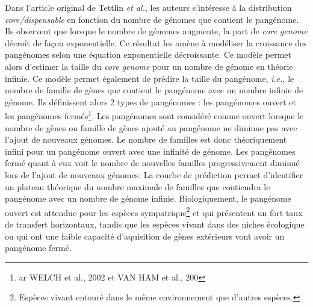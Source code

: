 Dans l'article original de Tettlin \textit{et al.}, les auteurs s'intéresse à la distribution \textit{core/dispensable} en fonction du nombre de génomes que contient le pangénome. Ils observent que lorsque le nombre de génomes augmente, la part de \textit{core genome} décroît de façon exponentielle. Ce résultat les amène à modéliser la croissance des pangénomes selon une équation exponentielle décroissante. Ce modèle permet alors d'estimer la taille du \textit{core genome} pour un nombre de génome en théorie infinie. Ce modèle permet également de prédire la taille du pangénome, \textit{i.e.}, le nombre de famille de gènes que contient le pangénome avec un nombre infinie de génome. Ils définissent alors 2 types de pangénomes : les pangénomes ouvert et les pangénomes fermés\footnote{ar WELCH et al., 2002 et VAN HAM et al., 200}. Les pangénomes sont considéré comme ouvert lorsque le nombre de gènes ou famille de gènes ajouté au pangénome ne diminue pas avec l'ajout de nouveaux génomes. Le nombre de familles est donc théoriquement infini pour un pangénome ouvert avec une infinité de génome. Les pangénomes fermé quant à eux voit le nombre de nouvelles familles progressivement diminué lors de l'ajout de nouveaux génomes. La courbe de prédiction permet d'identifier un plateau théorique du nombre maximale de familles que contiendra le pangénome avec un nombre de génome infinie. Biologiquement, le pangénome ouvert est attendue pour les espèces sympatrique\footnote{Espèces vivant entouré dans le même environnement que d'autres espèces.} et qui présentent un fort taux de transfert horizontaux, tandis que les espèces vivant dans des niches écologique ou qui ont une faible capacité d'aquisition de gènes extérieurs vont avoir un pangénome fermé.